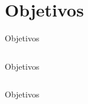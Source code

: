 \section{Objetivos}
\begin{frame}{Objetivos}
    \begin{columns}
        
        
    \end{columns}
\end{frame}


\begin{frame}{Objetivos}
    \begin{columns}
        
       
    \end{columns}
\end{frame}


\begin{frame}{Objetivos}
    \begin{columns}
        
    	
        
      
    \end{columns}
\end{frame}